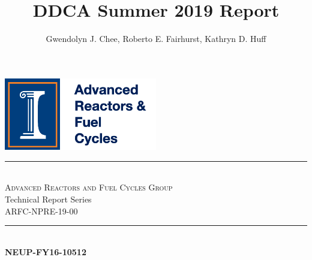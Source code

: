 \documentclass[11pt,letterpaper]{article}
\title{DDCA Summer 2019 Report}
\author{Gwendolyn J. Chee, Roberto E. Fairhurst, Kathryn D. Huff}
\begin{document}
	
\begin{titlepage} %
	\newcommand{\HRule}{\rule{\linewidth}{0.5mm}} %
	
	\center %
	
	
	\vfill\vfill
	\includegraphics[width=0.5\textwidth]{figures/logo.png} %
	
	
	
	\vspace{1cm}
	\HRule\\[0.4cm]
	\textsc{\Large Advanced Reactors and Fuel Cycles Group}\\
	{\Large Technical Report Series}\\ %
	
	{\large ARFC-NPRE-19-00}\\ %
	
	
	
	\HRule\\[0.4cm]
	
	{\huge\bfseries NEUP-FY16-10512}\\[0.4cm] %
	

\end{titlepage}
\end{document}
